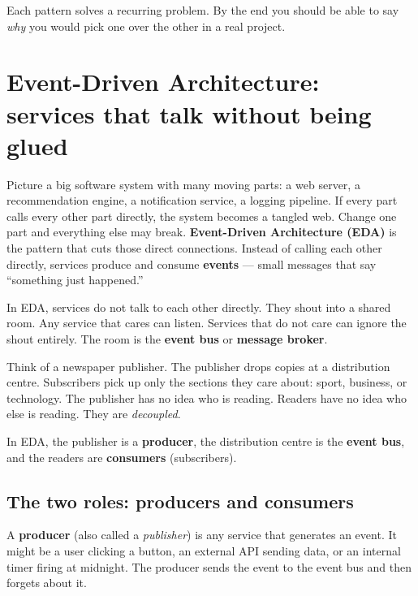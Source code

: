 \documentclass[a4paper,11pt]{article}
\newcommand{\vocab}[1]{\textbf{\color{navy}#1}}
\begin{document}
Each pattern solves a recurring problem. By the end you should be able to say
\emph{why} you would pick one over the other in a real project.

\section{Event-Driven Architecture: services that talk without being glued}

Picture a big software system with many moving parts: a web server,
a recommendation engine, a notification service, a logging pipeline.
If every part calls every other part directly, the system becomes a tangled
web. Change one part and everything else may break.
\vocab{Event-Driven Architecture (EDA)} is the pattern that cuts those direct
connections. Instead of calling each other directly, services produce and
consume \vocab{events} --- small messages that say ``something just happened.''

\begin{intuition}
In EDA, services do not talk to each other directly. They shout into a shared
room. Any service that cares can listen. Services that do not care can ignore
the shout entirely. The room is the \textbf{event bus} or
\textbf{message broker}.
\end{intuition}

\begin{everyday}
Think of a newspaper publisher. The publisher drops copies at a distribution
centre. Subscribers pick up only the sections they care about: sport,
business, or technology. The publisher has no idea who is reading.
Readers have no idea who else is reading. They are \emph{decoupled}.

In EDA, the publisher is a \textbf{producer}, the distribution centre is the
\textbf{event bus}, and the readers are \textbf{consumers} (subscribers).
\end{everyday}

\subsection{The two roles: producers and consumers}

A \vocab{producer} (also called a \emph{publisher}) is any service that
generates an event. It might be a user clicking a button, an external API
sending data, or an internal timer firing at midnight. The producer sends the
event to the event bus and then forgets about it.
\end{document}
